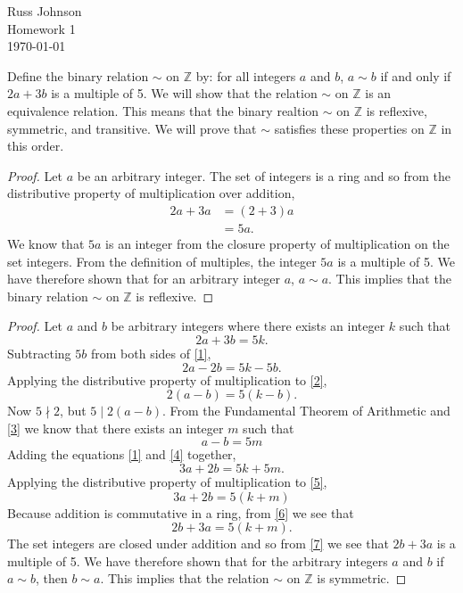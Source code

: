 \documentclass[12pt]{article}
\begin{document}
\begin{flushright}
Russ Johnson\\
Homework 1\\
\today\\
\end{flushright}
Define the binary relation $\sim$ on $\mathbb{Z}$ by: for all integers $a$ and $b$, $a\sim b$ if and only if $2a+3b$ is a multiple of 5. We will show that the relation $\sim$ on $\mathbb{Z}$ is an equivalence relation. This means that the binary realtion $\sim$ on $\mathbb{Z}$ is reflexive, symmetric, and transitive. We will prove that $\sim$ satisfies these properties on $\mathbb{Z}$ in this order.

\begin{proof}
Let $a$ be an arbitrary integer. The set of integers is a ring and so from the distributive property of multiplication over addition,
\begin{align*}
2a+3a &= (2+3)a \\
&= 5a.
\end{align*}
We know that $5a$ is an integer from the closure property of multiplication on the set integers. From the definition of multiples, the integer $5a$ is a multiple of 5. We have therefore shown that for an arbitrary integer $a$, $a\sim a$. This implies that the binary relation $\sim$ on $\mathbb{Z}$ is reflexive.
\end{proof}

\begin{proof}
Let $a$ and $b$ be arbitrary integers where there exists an integer $k$ such that
\begin{equation}\label{1}
2a + 3b = 5k.
\end{equation}
Subtracting $5b$ from both sides of \eqref{1},
\begin{equation}\label{2}
2a - 2b = 5k - 5b.
\end{equation}
Applying the distributive property of multiplication to \eqref{2},
\begin{equation}\label{3}
2(a-b) = 5(k-b).
\end{equation}
Now $5\nmid 2$, but $5\mid 2(a-b)$. From the Fundamental Theorem of Arithmetic and \eqref{3} we know that there exists an integer $m$ such that
\begin{equation}\label{4}
a-b=5m
\end{equation}
Adding the equations \eqref{1} and \eqref{4} together,
\begin{equation}\label{5}
3a + 2b = 5k + 5m.
\end{equation}
Applying the distributive property of multiplication to \eqref{5},
\begin{equation}\label{6}
3a + 2b = 5(k+m)
\end{equation}
Because addition is commutative in a ring, from \eqref{6} we see that
\begin{equation}\label{7}
2b + 3a = 5(k+m).
\end{equation}
The set integers are closed under addition and so from \eqref{7} we see that $2b+3a$ is a multiple of 5. We have therefore shown that for the arbitrary integers $a$ and $b$ if $a\sim b$, then $b \sim a$. This implies that the relation $\sim$ on $\mathbb{Z}$ is symmetric.
\end{proof}
\end{document}
